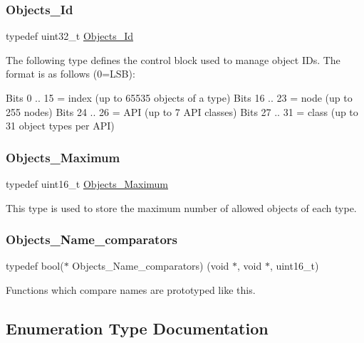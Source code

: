 \subsubsection{\texorpdfstring{Objects\_Id}{Objects\_Id}}
{\footnotesize\ttfamily typedef uint32\+\_\+t \mbox{\hyperlink{group__RTEMSScoreObject_ga5821f52a51072941bdd603e542d0863e}{Objects\+\_\+\+Id}}}

The following type defines the control block used to manage object I\+Ds. The format is as follows (0=L\+SB)\+:

Bits 0 .. 15 = index (up to 65535 objects of a type) Bits 16 .. 23 = node (up to 255 nodes) Bits 24 .. 26 = A\+PI (up to 7 A\+PI classes) Bits 27 .. 31 = class (up to 31 object types per A\+PI) \mbox{\label{group__RTEMSScoreObject_gaa2735357885ec7d7157c32f3f835f9ae}} 
\subsubsection{\texorpdfstring{Objects\_Maximum}{Objects\_Maximum}}
{\footnotesize\ttfamily typedef uint16\+\_\+t \mbox{\hyperlink{group__RTEMSScoreObject_gaa2735357885ec7d7157c32f3f835f9ae}{Objects\+\_\+\+Maximum}}}

This type is used to store the maximum number of allowed objects of each type. \mbox{\label{group__RTEMSScoreObject_ga611038b478f991746dee86b76eca513b}} 
\subsubsection{\texorpdfstring{Objects\_Name\_comparators}{Objects\_Name\_comparators}}
{\footnotesize\ttfamily typedef bool($\ast$ Objects\+\_\+\+Name\+\_\+comparators) (void $\ast$, void $\ast$, uint16\+\_\+t)}

Functions which compare names are prototyped like this. 

\subsection{Enumeration Type Documentation}
\mbox{\label{group__RTEMSScoreObject_ga2d2636c8d2f1564f3e5b2b14e761574b}} 
